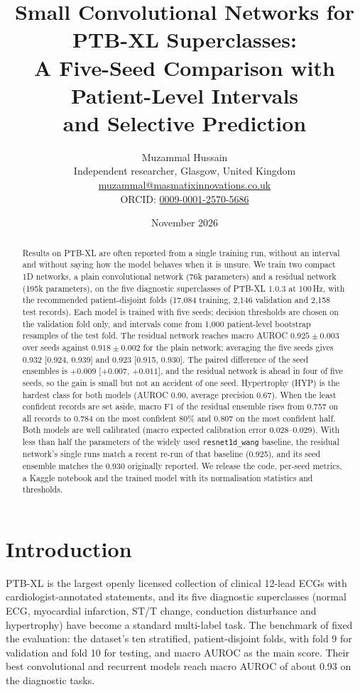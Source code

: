 \documentclass[11pt,a4paper]{article}
\title{\textbf{Small Convolutional Networks for PTB-XL Superclasses:\\A Five-Seed Comparison with Patient-Level Intervals\\and Selective Prediction}}
\author{Muzammal Hussain\\
\small Independent researcher, Glasgow, United Kingdom\\
\small \href{mailto:muzammal@masmatixinnovations.co.uk}{muzammal@masmatixinnovations.co.uk}\\
\small ORCID: \href{https://orcid.org/0009-0001-2570-5686}{0009-0001-2570-5686}}
\date{\small November 2026}
\newcommand{\code}[1]{\texttt{#1}}
\begin{document}
\maketitle

\begin{abstract}
\noindent
Results on PTB-XL are often reported from a single training run, without an interval and without saying how the
model behaves when it is unsure. We train two compact 1D networks, a plain convolutional network (76k parameters)
and a residual network (195k parameters), on the five diagnostic superclasses of PTB-XL 1.0.3 at 100\,Hz, with the
recommended patient-disjoint folds (17,084 training, 2,146 validation and 2,158 test records). Each model is
trained with five seeds; decision thresholds are chosen on the validation fold only, and intervals come from 1,000
patient-level bootstrap resamples of the test fold. The residual network reaches macro AUROC
$0.925 \pm 0.003$ over seeds against $0.918 \pm 0.002$ for the plain network; averaging the five seeds gives 0.932
[0.924, 0.939] and 0.923 [0.915, 0.930]. The paired difference of the seed ensembles is $+0.009$ [$+0.007$, $+0.011$],
and the residual network is ahead in four of five seeds, so the gain is small but not an accident of one seed.
Hypertrophy (HYP) is the hardest class for both models (AUROC 0.90, average precision 0.67). When the least
confident records are set aside, macro F1 of the residual ensemble rises from 0.757 on all records to 0.784 on the
most confident 80\% and 0.807 on the most confident half. Both models are well calibrated (macro expected
calibration error 0.028--0.029). With less than half the parameters of the widely used \code{resnet1d\_wang}
baseline, the residual network's single runs match a recent re-run of that baseline (0.925), and its seed ensemble
matches the 0.930 originally reported. We release the code, per-seed metrics, a Kaggle notebook
and the trained model with its normalisation statistics and thresholds.
\end{abstract}

\section{Introduction}

PTB-XL \citep{wagner2020ptbxl} is the largest openly licensed collection of clinical 12-lead ECGs with
cardiologist-annotated statements, and its five diagnostic superclasses (normal ECG, myocardial infarction,
ST/T change, conduction disturbance and hypertrophy) have become a standard multi-label task. The benchmark of
\citet{strodthoff2021benchmarks} fixed the evaluation: the dataset's ten stratified, patient-disjoint folds, with
fold 9 for validation and fold 10 for testing, and macro AUROC as the main score. Their best convolutional and
recurrent models reach macro AUROC of about 0.93 on the diagnostic tasks.
\end{document}
